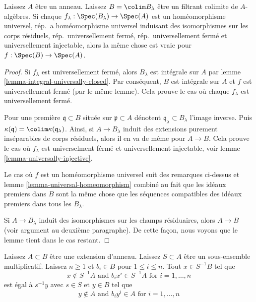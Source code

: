 \begin{lemma}

\label{lemma-colimit-inherits}
Laissez $A$ être un anneau. Laissez $B = \colim B_\lambda$ être un filtrant colimite de $A$-algèbres. Si chaque $f_\lambda : \Spec(B_\lambda) \to \Spec(A)$ est un homéomorphisme universel, rép.\ a homéomorphisme universel induisant des isomorphismes sur les corps résiduels, rép.\ universellement fermé, rép.\ universellement fermé et universellement injectable, alors la même chose est vraie pour $f : \Spec(B) \to \Spec(A)$.
\end{lemma}

\begin{proof}
Si $f_\lambda$ est universellement fermé, alors $B_\lambda$ est intégrale sur $A$ par lemme \ref{lemma-integral-universally-closed}. Par conséquent, $B$ est intégrale sur $A$ et $f$ est universellement fermé (par le même lemme). Cela prouve le cas où chaque $f_\lambda$ est universellement fermé.

\medskip\noindent
Pour une première $\mathfrak q \subset B$ située sur $\mathfrak p \subset A$ dénotent $\mathfrak q_\lambda \subset B_\lambda$ l'image inverse. Puis $\kappa(\mathfrak q) = \colim \kappa(\mathfrak q_\lambda)$. Ainsi, si $A \to B_\lambda$ induit des extensions purement inséparables de corps résiduels, alors il en va de même pour $A \to B$. Cela prouve le cas où $f_\lambda$ est universelment férmé et universellement injectable, voir lemme \ref{lemma-universally-injective}.

\medskip\noindent
Le cas où $f$ est un homéomorphisme universel suit des remarques ci-dessus et lemme \ref{lemma-universal-homeomorphism} combiné au fait que les idéaux premiers dans $B$ sont la même chose que les séquences compatibles des idéaux premiers dans tous les $B_\lambda$.

\medskip\noindent

Si $A \to B_\lambda$ induit des isomorphismes sur les champs résiduaires, alors $A \to B$ (voir argument au deuxième paragraphe). De cette façon, nous voyons que le lemme tient dans le cas restant.

\end{proof}

\begin{lemma}

\label{lemma-special-elements-and-localization}
Laissez $A \subset B$ être une extension d'anneau. Laissez $S \subset A$ être un sous-ensemble multiplicatif. Laissez $n \geq 1$ et $b_i \in B$ pour $1 \leq i \leq n$. Tout $x \in S^{-1}B$ tel que $$
x \not \in S^{-1}A\text{ and } b_i x^i \in S^{-1}A\text{ for }i = 1, \ldots, n
$$ est égal à $s^{-1}y$ avec $s \in S$ et $y \in B$ tel que $$
y \not \in A\text{ and } b_i y^i \in A\text{ for }i = 1, \ldots, n
$$
\end{lemma}

